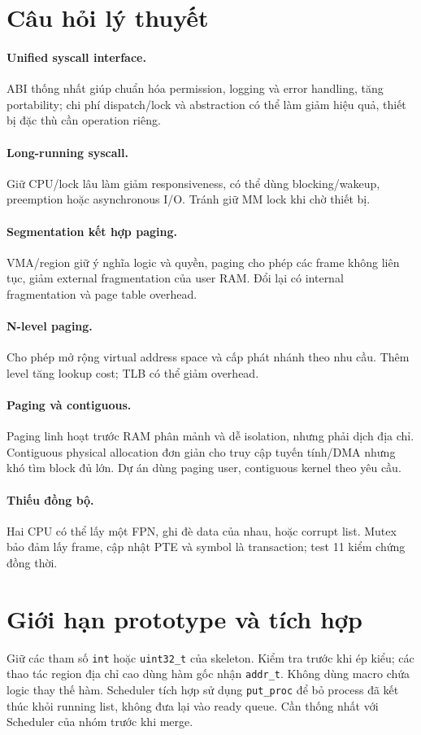 \documentclass[11pt,a4paper]{article}
\begin{document}
\section{Câu hỏi lý thuyết}
\paragraph{Unified syscall interface.} ABI thống nhất giúp chuẩn hóa permission, logging và error handling, tăng portability; chi phí dispatch/lock và abstraction có thể làm giảm hiệu quả, thiết bị đặc thù cần operation riêng.
\paragraph{Long-running syscall.} Giữ CPU/lock lâu làm giảm responsiveness, có thể dùng blocking/wakeup, preemption hoặc asynchronous I/O. Tránh giữ MM lock khi chờ thiết bị.
\paragraph{Segmentation kết hợp paging.} VMA/region giữ ý nghĩa logic và quyền, paging cho phép các frame không liên tục, giảm external fragmentation của user RAM. Đổi lại có internal fragmentation và page table overhead.
\paragraph{N-level paging.} Cho phép mở rộng virtual address space và cấp phát nhánh theo nhu cầu. Thêm level tăng lookup cost; TLB có thể giảm overhead.
\paragraph{Paging và contiguous.} Paging linh hoạt trước RAM phân mảnh và dễ isolation, nhưng phải dịch địa chỉ. Contiguous physical allocation đơn giản cho truy cập tuyến tính/DMA nhưng khó tìm block đủ lớn. Dự án dùng paging user, contiguous kernel theo yêu cầu.
\paragraph{Thiếu đồng bộ.} Hai CPU có thể lấy một FPN, ghi đè data của nhau, hoặc corrupt list. Mutex bảo đảm lấy frame, cập nhật PTE và symbol là transaction; test 11 kiểm chứng đồng thời.
\section{Giới hạn prototype và tích hợp}
Giữ các tham số \texttt{int} hoặc \texttt{uint32\_t} của skeleton. Kiểm tra trước khi ép kiểu; các thao tác region địa chỉ cao dùng hàm gốc nhận \texttt{addr\_t}. Không dùng macro chứa logic thay thế hàm. Scheduler tích hợp sử dụng \texttt{put\_proc} để bỏ process đã kết thúc khỏi running list, không đưa lại vào ready queue. Cần thống nhất với Scheduler của nhóm trước khi merge.
\end{document}

